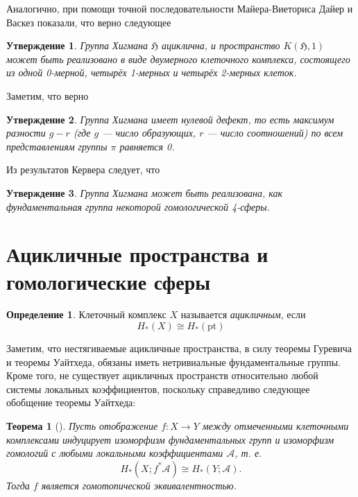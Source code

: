 \documentclass[14pt, dvipsnames, twoside]{extarticle}
\newtheorem{theorem}{Теорема}
\newtheorem{statement}{Утверждение}
\theoremstyle{definition}
\newtheorem{defi}{Определение}
\theoremstyle{remark}
\begin{document}
Аналогично, при помощи точной последовательности Майера-Виеториса Дайер и Васкез показали, что верно следующее

\begin{statement}
Группа Хигмана $\mathfrak{H}$ ациклична, и пространство $K(\mathfrak{H}, 1)$ может быть реализовано в виде двумерного клеточного комплекса, состоящего из одной 0-мерной, четырёх 1-мерных и четырёх 2-мерных клеток.
\end{statement}

Заметим, что верно 

\begin{statement}
Группа Хигмана имеет нулевой дефект, то есть максимум разности $g-r$ (где $g$ --- число образующих, $r$ --- число соотношений) по всем представлениям группы $\pi$ равняется 0.
\end{statement}

Из результатов Кервера следует, что 

\begin{statement}
Группа Хигмана может быть реализована, как фундаментальная группа некоторой гомологической 4-сферы.
\end{statement}

\fi













 
 
 
 
 
 
 \section{Ацикличные пространства и гомологические сферы}
 
 \begin{defi}
 Клеточный комплекс $X$ называется {\it ацикличным}, если $$H_\ast(X)\cong H_\ast(\mathrm{pt})$$ 
 \end{defi}


Заметим, что нестягиваемые ацикличные пространства, в силу теоремы Гуревича и теоремы Уайтхеда, обязаны иметь нетривиальные фундаментальные группы. Кроме того, не существует ацикличных пространств относительно любой системы локальных коэффициентов, поскольку справедливо следующее обобщение теоремы Уайтхеда:

\begin{theorem}[\cite{QuillenHomAlg}]\label{WhiteheadNonSimplyConnected}
Пусть отображение $f: X\to Y$ между отмеченными клеточными комплексами индуцирует изоморфизм фундаментальных групп и изоморфизм гомологий с любыми локальными коэффициентами $\mathcal{A}$, т. е. $$H_\ast(X; f^\ast\mathcal{A})\cong H_\ast(Y; \mathcal{A}).$$ Тогда $f$ является гомотопической эквивалентностью.
\end{theorem}  
\end{document}
